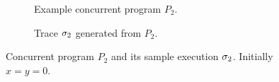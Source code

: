 
\begin{figure}[h]
\centering
\begin{subfigure}{.5\textwidth}
  \centering
  \caption{Example concurrent program $P_2$.}
  \label{fig:program2}
\end{subfigure}%
\begin{subfigure}{.5\textwidth}
  \centering
  \vspace{0.25in}
  \caption{Trace $\sigma_2$ generated from $P_2$.}
  \label{fig:trace2}
\end{subfigure}
\caption{Concurrent program $P_2$ and its sample execution
  $\sigma_2$. Initially $x = y = 0$.}
\label{fig:example2}
\end{figure}
